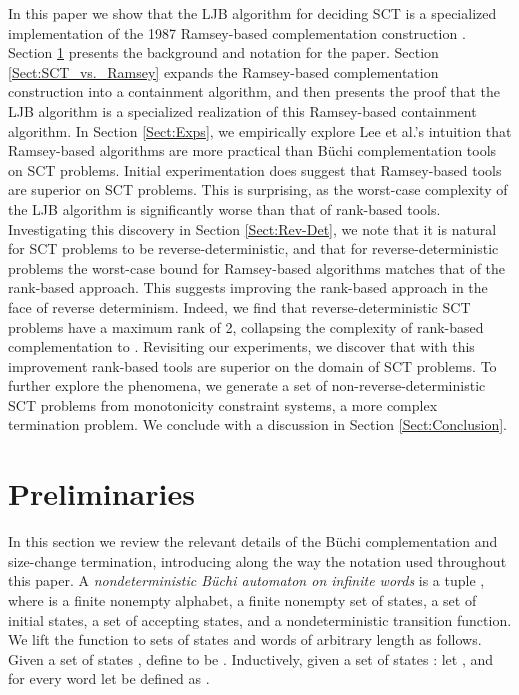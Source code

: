 \documentclass{LMCS}
\newcommand\buchi{B\"uchi }
\begin{document}
In this paper we show that the LJB algorithm for deciding SCT
\cite{LJB01} is a specialized implementation of the 1987 Ramsey-based
complementation construction \cite{SVW85}. Section \ref{Sect:Prelim} presents
the background and notation for the paper.  Section \ref{Sect:SCT_vs._Ramsey}
expands the Ramsey-based complementation construction into a containment
algorithm, and then presents the proof that the LJB algorithm is a specialized
realization of this Ramsey-based containment algorithm.  In Section \ref{Sect:Exps}, we
empirically explore Lee et al.'s intuition that Ramsey-based algorithms are more
practical than \buchi complementation tools on SCT problems. Initial
experimentation does suggest that Ramsey-based tools are superior on SCT
problems. This is surprising, as the worst-case complexity of the LJB algorithm
is significantly worse than that of rank-based tools.  Investigating this
discovery in Section \ref{Sect:Rev-Det}, we note that it is natural for SCT problems to be
reverse-deterministic, and that for reverse-deterministic problems the
worst-case bound for Ramsey-based algorithms matches that of the rank-based
approach. This suggests improving the rank-based approach in the face of reverse
determinism. Indeed, we find that reverse-deterministic SCT problems have a
maximum rank of 2, collapsing the complexity of rank-based complementation to
.  Revisiting our experiments, we discover that with this improvement rank-based tools are
superior on the domain of SCT problems. To further explore the phenomena, we generate a set of
non-reverse-deterministic SCT problems from monotonicity constraint systems, a more complex
termination problem.  We conclude with a discussion in Section
\ref{Sect:Conclusion}. 

\section{Preliminaries} \label{Sect:Prelim} 

In this section we review the relevant details of the \buchi complementation and
size-change termination, introducing along the way the notation used throughout
this paper.  A \emph{nondeterministic \buchi automaton on infinite words} is a
tuple , where  is a finite nonempty
alphabet,  a finite nonempty set of states,  a set of
initial states,  a set of accepting states, and  a nondeterministic transition function. We lift the
 function to sets of states and words of arbitrary length as follows.
Given a set of states , define  to be . Inductively, given a set of states : let
, and for every word  let  be
defined as . 
\end{document}
